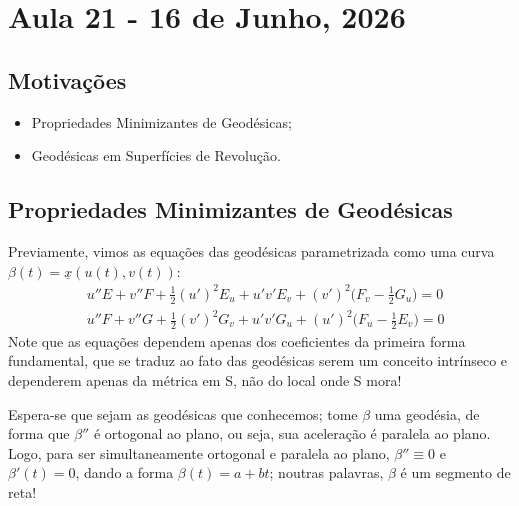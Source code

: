 \documentclass[../differential_geometry.tex]{subfiles}
\begin{document}
\section{Aula 21 - 16 de Junho, 2026}
\subsection{Motivações}
\begin{itemize}
	\item Propriedades Minimizantes de Geodésicas;
	\item Geodésicas em Superfícies de Revolução.
\end{itemize}
\subsection{Propriedades Minimizantes de Geodésicas}
Previamente, vimos as equações das geodésicas parametrizada como uma curva \(\beta (t) = \underline{x}(u(t), v(t))\):
\begin{align*}
	 & \boxed{u''E + v''F + \frac{1}{2}(u')^{2}E_{u} + u'v'E_{v}+(v')^{2}\biggl(F_{v}-\frac{1}{2}G_{u}\biggr)=0} \\
	 & \boxed{u''F + v''G + \frac{1}{2}(v')^{2}G_{v} + u'v'G_{u}+(u')^{2}\biggl(F_{u}-\frac{1}{2}E_{v}\biggr)=0}
\end{align*}
Note que as equações dependem apenas dos coeficientes da primeira forma fundamental, que se traduz ao fato das geodésicas serem um conceito intrínseco e dependerem apenas da métrica em S, não do local onde S mora!
\begin{example}
	Espera-se que sejam as geodésicas que conhecemos; tome \(\beta \) uma geodésia, de forma que \(\beta ''\) é ortogonal ao plano, ou seja, sua aceleração é paralela ao plano. Logo, para ser simultaneamente ortogonal e paralela ao plano, \(\beta''\equiv 0 \) e \(\beta '(t) = 0\), dando a forma \(\beta (t) = a + bt\); noutras palavras, \(\beta \) é um segmento de reta!
\end{example}
\end{document}
